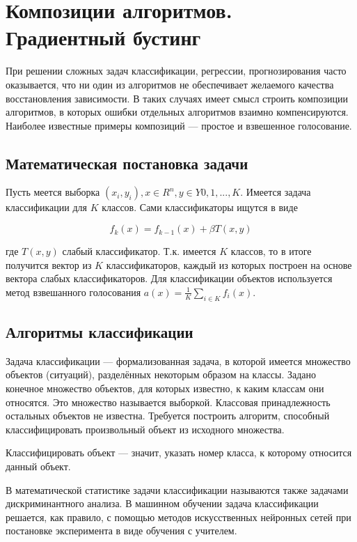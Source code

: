 \section{Композиции алгоритмов. Градиентный бустинг}

При решении сложных задач классификации, регрессии, прогнозирования часто оказывается, что ни один из алгоритмов не обеспечивает желаемого качества восстановления зависимости. В таких случаях имеет смысл строить композиции алгоритмов, в которых ошибки отдельных алгоритмов взаимно компенсируются. Наиболее известные примеры композиций — простое и взвешенное голосование. 

\subsection{Математическая постановка задачи}

Пусть меется выборка $(x_i,y_i) , x \in R^n , y \in Y{0,1,...,K}$. Имеется задача классификации для $K$ классов. Сами классификаторы ищутся в виде

\begin{equation}
 f_k(x)=f_{k-1}(x)+\beta T(x,y)
\end{equation}
\par
 где $T(x,y)$ слабый классификатор. Т.к. имеется $K$ классов, то в итоге получится вектор из $K$ классификаторов, каждый из которых построен на основе вектора слабых классификаторов. Для классификации объектов используется метод взвешанного голосования $a(x)=\frac{1}{K}\sum_{i \in K}f_i(x)$. 

\subsection{Алгоритмы классификации}

Задача классификации — формализованная задача, в которой имеется множество объектов (ситуаций), разделённых некоторым образом на классы. Задано конечное множество объектов, для которых известно, к каким классам они относятся. Это множество называется выборкой. Классовая принадлежность остальных объектов не известна. Требуется построить алгоритм, способный классифицировать произвольный объект из исходного множества.

Классифицировать объект — значит, указать номер класса, к которому относится данный объект.

В математической статистике задачи классификации называются также задачами дискриминантного анализа. В машинном обучении задача классификации решается, как правило, с помощью методов искусственных нейронных сетей при постановке эксперимента в виде обучения с учителем.

